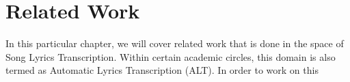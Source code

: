
\chapter{Related Work} 
\label{sec:relatedwork}

In this particular chapter, we will cover related work that is done in the space of Song Lyrics Transcription. Within certain academic circles, this domain is also termed as Automatic Lyrics Transcription (ALT). In order to work on this 



